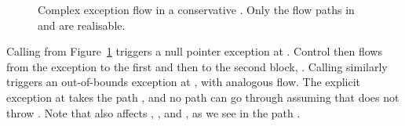 \begin{figure}[h]
\caption{Complex exception flow in a conservative {\CFG}.  Only the flow paths in  and  are realisable.}
\label{fig:exn-flow-example}
\end{figure}

Calling  from Figure~\ref{fig:exn-flow-example} triggers a null pointer exception at
.  Control then flows
from the exception to the first and then to the second  block,
\succarrow{}\succarrow{}.
Calling  similarly triggers an out-of-bounds exception at
, with analogous flow.
The explicit exception at  takes the path
\succarrow{}\succarrow{}\succarrow{},
and no path can go through  assuming that  does not throw .
Note that  also affects
, , and , as we see in the path
\succarrow{}\succarrow{}.

